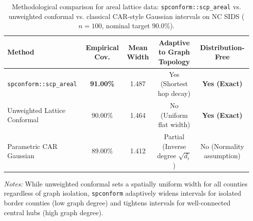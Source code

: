 \documentclass[11pt,a4paper]{article}
\begin{document}
\vspace{1.5em}

\begin{table}[htbp]
\centering
\small
\begin{threeparttable}
\caption{Methodological comparison for areal lattice data: \texttt{spconform::scp\_areal} vs. unweighted conformal vs. classical CAR-style Gaussian intervals on NC SIDS ($n = 100$, nominal target $90.0\%$).}
\label{tab:areal_comparison}
\begin{tabular}{lcccc}
\toprule
\textbf{Method} & \textbf{Empirical Cov.} & \textbf{Mean Width} & \textbf{Adaptive to Graph Topology} & \textbf{Distribution-Free} \\
\midrule
\texttt{spconform::scp\_areal} & \textbf{91.00\%} & 1.487 & Yes (Shortest hop decay) & \textbf{Yes (Exact)} \\
Unweighted Lattice Conformal & 90.00\% & 1.464 & No (Uniform flat width) & \textbf{Yes (Exact)} \\
Parametric CAR Gaussian & 89.00\% & 1.412 & Partial (Inverse degree $\sqrt{d_i}$) & No (Normality assumption) \\
\bottomrule
\end{tabular}
\begin{tablenotes}[flushleft]
\footnotesize
\item \textit{Notes:} While unweighted conformal sets a spatially uniform width for all counties regardless of graph isolation, \texttt{spconform} adaptively widens intervals for isolated border counties (low graph degree) and tightens intervals for well-connected central hubs (high graph degree).
\end{tablenotes}
\end{threeparttable}
\end{table}
\end{document}
